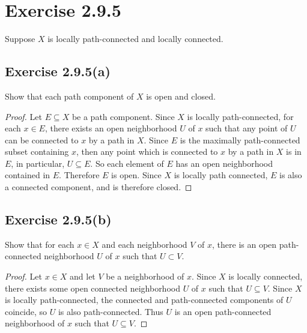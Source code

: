 \documentclass[12pt]{article}
\newenvironment{problem}
    {\begin{lrbox}{\mybox}\begin{minipage}{\textwidth-10pt}}
    {\end{minipage}\end{lrbox}\framebox[6.5in]{\usebox{\mybox}}}
\begin{document}
\section*{Exercise 2.9.5}
\begin{problem}
    Suppose $X$ is locally path-connected and locally connected.
\end{problem}

\subsection*{Exercise 2.9.5(a)}
\begin{problem}
    Show that each path component of $X$ is open and closed.
\end{problem}

\begin{proof}
    Let $E\subseteq X$ be a path component. Since $X$ is locally path-connected, for each $x\in E$, there exists an open neighborhood $U$ of $x$ such that any point of $U$ can be connected to $x$ by a path in $X$. Since $E$ is the maximally path-connected subset containing $x$, then any point which is connected to $x$ by a path in $X$ is in $E$, in particular, $U\subseteq E$. So each element of $E$ has an open neighborhood contained in $E$. Therefore $E$ is open. Since $X$ is locally path connected, $E$ is also a connected component, and is therefore closed.

\end{proof}

\subsection*{Exercise 2.9.5(b)}
\begin{problem}
    Show that for each $x\in X$ and each neighborhood $V$ of $x$, there is an open path-connected neighborhood $U$ of $x$ such that $U\subset V$.
\end{problem}

\begin{proof}
    Let $x\in X$ and let $V$ be a neighborhood of $x$. Since $X$ is locally connected, there exists some open connected neighborhood $U$ of $x$ such that $U\subseteq V$. Since $X$ is locally path-connected, the connected and path-connected components of $U$ coincide, so $U$ is also path-connected. Thus $U$ is an open path-connected neighborhood of $x$ such that $U\subseteq V$.
    
\end{proof}
\end{document}
